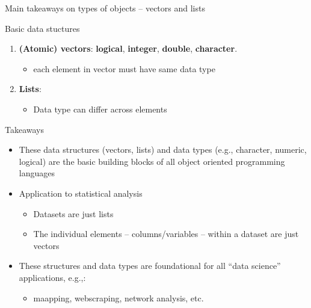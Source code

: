\documentclass[10pt,ignorenonframetext,]{beamer}
\providecommand{\tightlist}{%
  \setlength{\itemsep}{0pt}\setlength{\parskip}{0pt}}
\begin{document}
\begin{frame}{Main takeaways on types of objects -- vectors and lists}

Basic data stuctures

\begin{enumerate}
\def\labelenumi{\arabic{enumi}.}
\tightlist
\item
  \textbf{(Atomic) vectors}: \textbf{logical}, \textbf{integer},
  \textbf{double}, \textbf{character}.

  \begin{itemize}
  \tightlist
  \item
    each element in vector must have same data type
  \end{itemize}
\item
  \textbf{Lists}:

  \begin{itemize}
  \tightlist
  \item
    Data type can differ across elements
  \end{itemize}
\end{enumerate}

Takeaways

\begin{itemize}
\tightlist
\item
  These data structures (vectors, lists) and data types (e.g.,
  character, numeric, logical) are the basic building blocks of all
  object oriented programming languages
\item
  Application to statistical analysis

  \begin{itemize}
  \tightlist
  \item
    Datasets are just lists
  \item
    The individual elements -- columns/variables -- within a dataset are
    just vectors
  \end{itemize}
\item
  These structures and data types are foundational for all ``data
  science'' applications, e.g.,:

  \begin{itemize}
  \tightlist
  \item
    maapping, webscraping, network analysis, etc.
  \end{itemize}
\end{itemize}

\end{frame}
\end{document}
